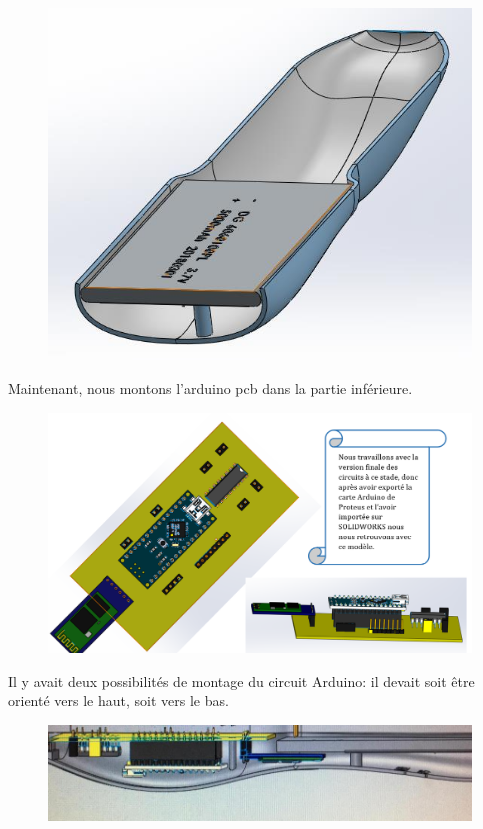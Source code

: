 \FloatBarrier

\begin{figure}[!htbp]
    \centering
    \includegraphics[width=.5\linewidth]{assets/conception1/img200.jpg}
\end{figure}

\FloatBarrier

Maintenant, nous montons l’arduino pcb dans la partie inférieure.

\begin{figure}[!htbp]
    \centering
    \includegraphics[width=\linewidth]{assets/conception1/12.png}
\end{figure}

\FloatBarrier

Il y avait deux possibilités de montage du circuit Arduino: il devait soit être orienté vers le haut, soit vers le bas.

\begin{figure}[!htbp]
    \centering
    \includegraphics[width=\linewidth]{assets/conception1/img215.jpg}
\end{figure}

